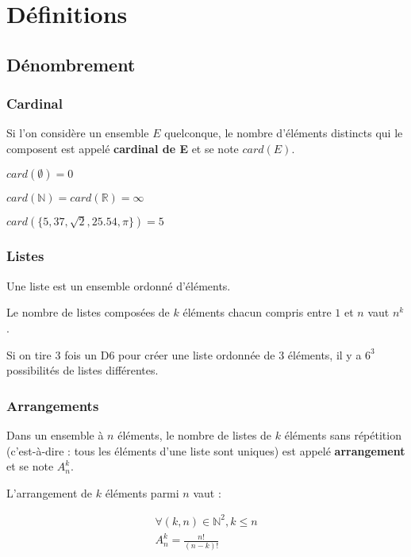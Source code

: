 \chapter{Définitions}
\label{Chapter01}

\section{Dénombrement}

\subsection{Cardinal}

Si l'on considère un ensemble $E$ quelconque, le nombre d'éléments distincts qui le composent est appelé \textbf{cardinal de E} et se note $card(E)$.

\begin{example}
	$card(\emptyset) = 0$

	$card(\mathbb{N}) = card(\mathbb{R}) = \infty$

	$card( \{5, 37, \sqrt{2}, 25.54, \pi\} ) = 5$
\end{example}

\subsection{Listes}

Une liste est un ensemble ordonné d'éléments.

\begin{definition}
	Le nombre de listes composées de $k$ éléments chacun compris entre $1$ et $n$ vaut $n^k$.
\end{definition}
\begin{example}
	Si on tire 3 fois un D6 pour créer une liste ordonnée de 3 éléments, il y a $6^3$ possibilités de listes différentes.
\end{example}

\subsection{Arrangements}

Dans un ensemble à $n$ éléments, le nombre de listes de $k$ éléments sans répétition (c'est-à-dire : tous les éléments d'une liste sont uniques) est appelé \textbf{arrangement} et se note $A^k_n$.

\begin{definition}
	L'arrangement de $k$ éléments parmi $n$ vaut :

	\begin{equation*}
		\begin{split}
			\forall (k,n) \in \mathbb{N}^2, k \le n \\
			A^k_n = \frac{n!}{(n-k)!}
		\end{split}
	\end{equation*}
\end{definition}


